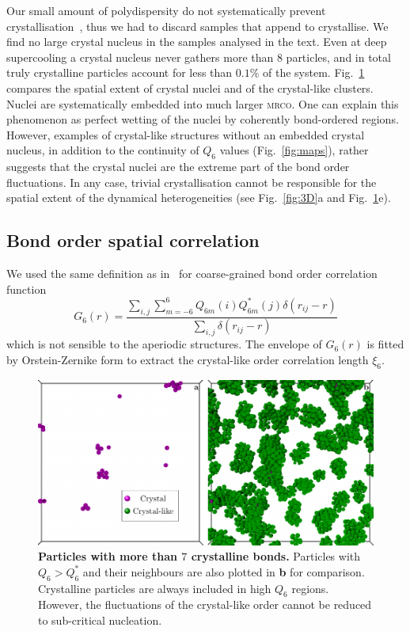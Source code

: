 Our small amount of polydispersity do not systematically prevent crystallisation~\cite{Zaccarelli2009}, thus we had to discard samples that append to crystallise. We find no large crystal nucleus in the samples analysed in the text. Even at deep supercooling a crystal nucleus never gathers more than 8 particles, and in total truly crystalline particles account for less than $0.1\%$ of the system. Fig.~\ref{fig:X_3D} compares the spatial extent of crystal nuclei and of the crystal-like clusters. Nuclei are systematically embedded into much larger \textsc{mrco}. One can explain this phenomenon as perfect wetting of the nuclei by coherently bond-ordered regions. However, examples of crystal-like structures without an embedded crystal nucleus, in addition to the continuity of $Q_6$ values (Fig.~\ref{fig:maps}), rather suggests that the crystal nuclei are the extreme part of the bond order fluctuations. In any case, trivial crystallisation cannot be responsible for the spatial extent of the dynamical heterogeneities (see Fig.~\ref{fig:3D}a and Fig.~\ref{fig:X_3D}e).

\subsection*{Bond order spatial correlation}

We used the same definition as in~\cite{tanaka2010critical} for coarse-grained bond order correlation function
\begin{equation}
	G_6(r) = \frac{\sum_{i,j} \sum_{m=-6}^{6} Q_{6 m}(i) Q_{6 m}^{*}(j) \delta(r_{ij}-r)}{\sum_{i,j} \delta(r_{ij}-r)}
	\label{eq:G_6}
\end{equation}
which is not sensible to the aperiodic structures. The envelope of $G_6(r)$ is fitted by Orstein-Zernike form to extract the crystal-like order correlation length $\xi_6$.

\clearpage

\begin{figure}
\begin{center}
\includegraphics{generate_figures-figure4.pdf}
\end{center}
\caption{\textbf{Particles with more than $7$ crystalline bonds.} Particles with $Q_6>Q_6^*$ and their neighbours are also plotted in \textbf{b} for comparison. Crystalline particles are always included in high $Q_6$ regions. However, the fluctuations of the crystal-like order cannot be reduced to sub-critical nucleation.}
	\label{fig:X_3D}
\end{figure}

